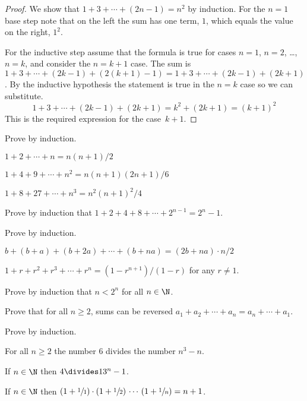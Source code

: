 \documentclass{ibl}
\begin{document}
\begin{proof}
  We show that $1+3+\cdots+(2n-1)=n^2$ by induction.
  For the $n=1$ base step note that on the left the sum has one term, $1$,
  which equals the value on the right, $1^2$.

  For the inductive step assume that the 
  formula is true for cases $n=1$, $n=2$, \ldots, $n=k$, and 
  consider the $n=k+1$ case.
  The sum is $1+3+\cdots+(2k-1)+(2(k+1)-1)=1+3+\cdots+(2k-1)+(2k+1)$.
  By the inductive hypothesis the statement is true in the $n=k$ case
  so we can substitute.
  \begin{equation*}
    1+3+\cdots+(2k-1)+(2k+1)=k^2+(2k+1)=(k+1)^2
  \end{equation*}
  This is the required expression for the case~$k+1$.
\end{proof}

\begin{ex}
Prove by induction.
\begin{exes}
\item $1+2+\cdots+n=n(n+1)/2$
\item $1+4+9+\cdots+n^2=n(n+1)(2n+1)/6$
\item $1+8+27+\cdots+n^3=n^2(n+1)^2/4$
\end{exes}
\end{ex}

\begin{ex}
Prove by induction that
$1+2+4+8+\cdots+2^{n-1}=2^n-1$.  
\end{ex}

\begin{ex}
Prove by induction.
\begin{exes}
  \item {}
       $b+(b+a)+(b+2a)+\cdots+(b+na)=(2b+na)\cdot n/2$
  \item {}
        $1+r+r^2+r^3+\cdots+r^n=(1-r^{n+1})/(1-r)$ for any $r\neq 1$.
\end{exes}
\end{ex}

\begin{ex}
Prove by induction that $n<2^n$ for all $n\in\N$.  
\end{ex}

\begin{ex}
Prove that for all $n\geq 2$, sums can be reversed
$a_1+a_2+\cdots+a_n=a_n+\cdots+a_1$.   
\end{ex}

\begin{ex}
Prove by induction.
\begin{exes}
\item For all $n\geq 2$ the number $6$ divides the number $n^3-n$.
\item If $n\in\N$ then $4\divides 13^n-1$.
\item If $n\in\N$ then
    $(1+\sfrac{1}{1})\cdot(1+\sfrac{1}{2})\,\cdots\,(1+\sfrac{1}{n})=n+1$.
\end{exes}
\end{ex}
\end{document}
